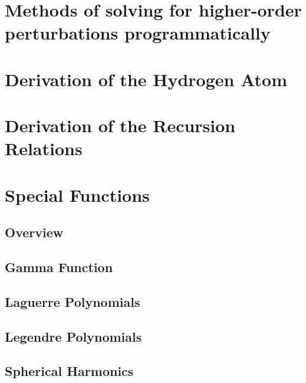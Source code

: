 \chapter{Methods of solving for higher-order perturbations programmatically} \label{sec:Program_perturbation}
\chapter{Derivation of the Hydrogen Atom}
\chapter{Derivation of the Recursion Relations}
\chapter{Special Functions}
    \section{Overview}
    \section{Gamma Function} \label{sec:Gamma_Function}
    \section{Laguerre Polynomials} \label{sec:Laguerre_Polynomial}
    \section{Legendre Polynomials} \label{sec:Legendre_Polynomial}
    \section{Spherical Harmonics}